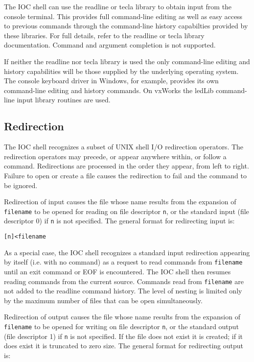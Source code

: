 The IOC shell can use the readline or tecla library to obtain input from the console terminal. This provides full command-line editing as well as easy access to previous commands through the command-line history capabilties provided by these libraries.
For full details, refer to the readline or tecla library documentation.
Command and argument completion is not supported.

If neither the readline nor tecla library is used the only command-line editing and history capabilities will be those supplied by the underlying operating system.
The console keyboard driver in Windows, for example, provides its own command-line editing and history commands.
On vxWorks the ledLib command-line input library routines are used.

\subsection{Redirection}

The IOC shell recognizes a subset of UNIX shell I/O redirection operators.
The redirection operators may precede, or appear anywhere within, or follow a command.
Redirections are processed in the order they appear, from left to right.
Failure to open or create a file causes the redirection to fail and the command to be ignored.

Redirection of input causes the file whose name results from the  expansion  of \verb|filename| to be  opened for reading on file descriptor \verb|n|, or the standard input (file descriptor 0) if \verb|n| is not specified.
The general format for redirecting input is:

\begin{verbatim}
[n]<filename
\end{verbatim}

As a special case, the IOC shell recognizes a standard input redirection appearing by itself (i.e. with no command) as a request to read commands from \verb|filename| until an exit command or EOF is encountered.
The IOC shell then resumes reading commands from the current source.
Commands read from \verb|filename| are not added to the readline command history.
The level of nesting is limited only by the maximum number of files that can be open simultaneously.

Redirection of output causes the file whose name results from the expansion of \verb|filename| to be opened for writing on file descriptor \verb|n|, or the standard output (file descriptor 1) if \verb|n| is not specified.
If the file does not exist it is created; if it does exist it is truncated to zero size.
The general format for redirecting output is:

